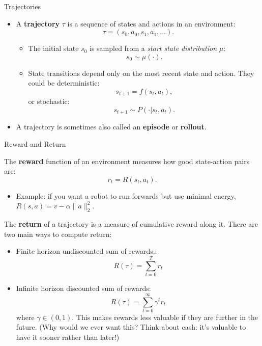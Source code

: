 \begin{frame}{Trajectories}

\begin{itemize}
\item A \textbf{trajectory} $\tau$ is a sequence of states and actions in an environment:
\begin{equation*}
\tau = (s_0, a_0, s_1, a_1, ...).
\end{equation*}
\begin{itemize}
\item The initial state $s_0$ is sampled from a \textit{start state distribution} $\mu$:
%
\begin{equation*}
s_0 \sim \mu(\cdot).
\end{equation*}
\item State transitions depend only on the most recent state and action. They could be deterministic:
%
\begin{equation*}
s_{t+1} = f(s_t, a_t),
\end{equation*}
%
or stochastic:
%
\begin{equation*}
s_{t+1} \sim P(\cdot | s_t, a_t).
\end{equation*}
\end{itemize}
\item A trajectory is sometimes also called an \textbf{episode} or \textbf{rollout}. 
\end{itemize}

\end{frame}


\begin{frame}{Reward and Return}

The \textbf{reward} function of an environment measures how good state-action pairs are:
%
\begin{equation*}
r_t = R(s_t, a_t).
\end{equation*}

\begin{itemize}
\item Example: if you want a robot to run forwards but use minimal energy, $R(s, a) = v - \alpha \|a\|_2^2$. 
\end{itemize}
\pause
The \textbf{return} of a trajectory is a measure of cumulative reward along it. There are two main ways to compute return:
\begin{itemize}
\item Finite horizon undiscounted sum of rewards::
\begin{equation*}
R(\tau) = \sum_{t=0}^T r_t
\end{equation*}
\item Infinite horizon discounted sum of rewards:
\begin{equation*}
R(\tau) = \sum_{t=0}^{\infty} \gamma^t r_t
\end{equation*}
%
where $\gamma \in (0,1)$. This makes rewards less valuable if they are further in the future. (Why would we ever want this? Think about cash: it's valuable to have it sooner rather than later!)
\end{itemize}

\end{frame}


